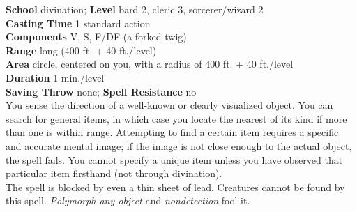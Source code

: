 \textbf{School} divination; \textbf{Level} bard 2, cleric 3, sorcerer/wizard 2\\
\textbf{Casting Time} 1 standard action\\
\textbf{Components} V, S, F/DF (a forked twig)\\
\textbf{Range} long (400 ft. + 40 ft./level)\\
\textbf{Area} circle, centered on you, with a radius of 400 ft. + 40 ft./level\\
\textbf{Duration} 1 min./level\\
\textbf{Saving Throw} none; \textbf{Spell Resistance} no\\
You sense the direction of a well-known or clearly visualized object. You can search for general items, in which case you locate the nearest of its kind if more than one is within range. Attempting to find a certain item requires a specific and accurate mental image; if the image is not close enough to the actual object, the spell fails. You cannot specify a unique item unless you have observed that particular item firsthand (not through divination).\\
The spell is blocked by even a thin sheet of lead. Creatures cannot be found by this spell. \textit{Polymorph any object }and\textit{ nondetection }fool it.\\
